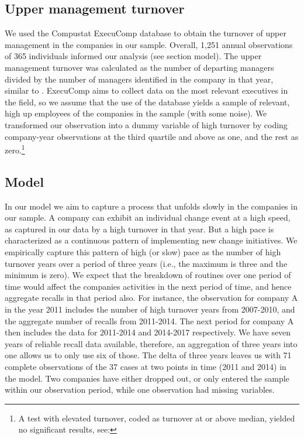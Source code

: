 \subsection{Upper management turnover}

We used the Compustat ExecuComp database to obtain the turnover of upper management in the companies in our sample. Overall, 1,251 annual observations of 365 individuals informed our analysis (see section model). The upper management turnover was calculated as the number of departing managers divided by the number of managers identified in the company in that year, similar to \citet{Glebbeek2004}. ExecuComp aims to collect data on the most relevant executives in the field, so we assume that the use of the database yields a sample of relevant, high up employees of the companies in the sample (with some noise). We transformed our observation into a dummy variable of high turnover by coding company-year observations at the third quartile and above as one, and the rest as zero.\footnote{A test with elevated turnover, coded as turnover at or above median, yielded no significant results, see: \log}

\subsection{Model}

In our model we aim to capture a process that unfolds slowly in the companies in our sample. A company can exhibit an individual change event at a high speed, as captured in our data by a high turnover in that year. But a high pace is characterized as a continuous pattern of implementing new change initiatives. We empirically capture this pattern of high (or slow) pace as the number of high turnover years over a period of three years (i.e., the maximum is three and the minimum is zero). We expect that the breakdown of routines over one period of time would affect the companies activities in the next period of time, and hence aggregate recalls in that period also. For instance, the observation for company A in the year 2011 includes the number of high turnover years from 2007-2010, and the aggregate number of recalls from 2011-2014. The next period for company A then includes the data for 2011-2014 and 2014-2017 respectively. We have seven years of reliable recall data available, therefore, an aggregation of three years into one allows us to only use six of those. The delta of three years leaves us with 71 complete observations of the 37 cases at two points in time (2011 and 2014) in the model. Two companies have either dropped out, or only entered the sample within our observation period, while one observation had missing variables.


